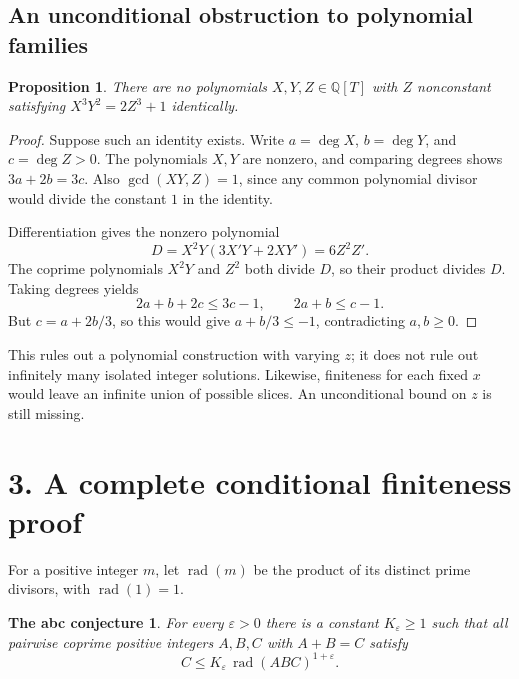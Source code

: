 \documentclass[11pt,a4paper]{article}
\newtheorem{proposition}{Proposition}
\newtheorem*{conjecture}{The abc conjecture}
\newcommand{\rad}{\operatorname{rad}}
\begin{document}
\subsection*{An unconditional obstruction to polynomial families}
\begin{proposition}
There are no polynomials $X,Y,Z\in\mathbb Q[T]$ with $Z$ nonconstant
satisfying $X^3Y^2=2Z^3+1$ identically.
\end{proposition}
\begin{proof}
Suppose such an identity exists. Write $a=\deg X$, $b=\deg Y$, and
$c=\deg Z>0$. The polynomials $X,Y$ are nonzero, and comparing degrees
shows $3a+2b=3c$. Also $\gcd(XY,Z)=1$, since any common polynomial divisor
would divide the constant $1$ in the identity.

Differentiation gives the nonzero polynomial
\[
 D=X^2Y(3X'Y+2XY')=6Z^2Z'.
\]
The coprime polynomials $X^2Y$ and $Z^2$ both divide $D$, so their product
divides $D$. Taking degrees yields
\[
 2a+b+2c\le3c-1,\qquad 2a+b\le c-1.
\]
But $c=a+2b/3$, so this would give $a+b/3\le-1$, contradicting
$a,b\ge0$.
\end{proof}

This rules out a polynomial construction with varying $z$; it does not
rule out infinitely many isolated integer solutions. Likewise, finiteness
for each fixed $x$ would leave an infinite union of possible slices.
An unconditional bound on $z$ is still missing.

\newpage
\section*{3. A complete conditional finiteness proof}
For a positive integer $m$, let $\rad(m)$ be the product of its distinct
prime divisors, with $\rad(1)=1$.

\begin{conjecture}
For every $\varepsilon>0$ there is a constant $K_\varepsilon\ge1$ such that
all pairwise coprime positive integers $A,B,C$ with $A+B=C$ satisfy
\[
 C\le K_\varepsilon\,\rad(ABC)^{1+\varepsilon}.
\]
\end{conjecture}
\end{document}

